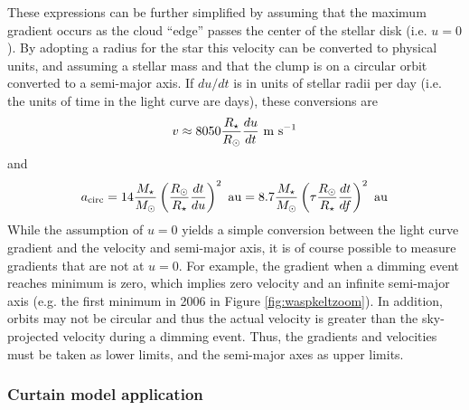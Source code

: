 \documentclass[]{rsos}
\begin{document}
These expressions can be further simplified by assuming that the maximum gradient occurs
as the cloud ``edge'' passes the center of the stellar disk (i.e. $u=0$). By adopting a
radius for the star this velocity can be converted to physical units, and assuming a
stellar mass and that the clump is on a circular orbit converted to a semi-major axis. If
$du/dt$ is in units of stellar radii per day (i.e. the units of time in the light curve
are days), these conversions are
\begin{equation}\label{eq:vcl}
  v \approx  8050 \frac{R_\star}{R_\odot} \frac{du}{dt} ~ {\rm m~s}^{-1}
\end{equation}
and
\begin{equation}\label{eq:acl}
  a_{\rm circ} %
  = 14 \frac{M_\star}{M_\odot} \left( \frac{R_\odot}{R_\star} \frac{dt}{du} \right)^2 ~
  {\rm au}
  = 8.7 \frac{M_\star}{M_\odot} \left( \tau \frac{R_\odot}{R_\star} \frac{dt}{df} \right)^2 ~
  {\rm au}
\end{equation}
While the assumption of $u=0$ yields a simple conversion between the light curve gradient
and the velocity and semi-major axis, it is of course possible to measure gradients that
are not at $u=0$. For example, the gradient when a dimming event reaches minimum is zero,
which implies zero velocity and an infinite semi-major axis (e.g. the first minimum in
2006 in Figure \ref{fig:waspkeltzoom}). In addition, orbits may not be circular and thus
the actual velocity is greater than the sky-projected velocity during a dimming
event. Thus, the gradients and velocities must be taken as lower limits, and the
semi-major axes as upper limits.

\subsubsection{Curtain model application}\label{sss:gradapp}
\end{document}
